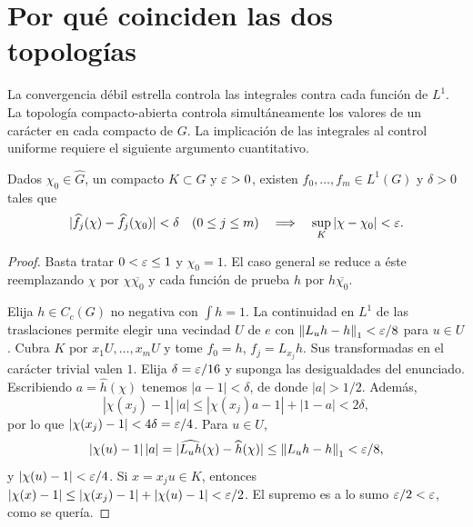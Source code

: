 \section{Por qué coinciden las dos topologías}
La convergencia débil estrella controla las integrales contra cada función de $L^1$. La topología compacto-abierta controla simultáneamente los valores de un carácter en cada compacto de $G$. La implicación de las integrales al control uniforme requiere el siguiente argumento cuantitativo.

\begin{lema}\label{v4:dual-vecindades-integrales}
Dados $\chi_0\in\widehat G$, un compacto $K\subset G$ y $\varepsilon>0$, existen $f_0,\ldots,f_m\in L^1(G)$ y $\delta>0$ tales que
\[
 |\widehat f_j(\chi)-\widehat f_j(\chi_0)|<\delta\quad(0\le j\le m)
 \quad\Longrightarrow\quad
 \sup_K|\chi-\chi_0|<\varepsilon.
\]
\end{lema}
\begin{proof}
Basta tratar $0<\varepsilon\le1$ y $\chi_0=1$. El caso general se reduce a éste reemplazando $\chi$ por $\chi\overline{\chi_0}$ y cada función de prueba $h$ por $h\overline{\chi_0}$.

Elija $h\in C_c(G)$ no negativa con $\int h=1$. La continuidad en $L^1$ de las traslaciones permite elegir una vecindad $U$ de $e$ con
$\left\lVert L_uh-h\right\rVert_1<\varepsilon/8$ para $u\in U$. Cubra $K$ por $x_1U,\ldots,x_mU$ y tome $f_0=h$, $f_j=L_{x_j}h$. Sus transformadas en el carácter trivial valen $1$. Elija $\delta=\varepsilon/16$ y suponga las desigualdades del enunciado. Escribiendo $a=\widehat h(\chi)$ tenemos $|a-1|<\delta$, de donde $|a|>1/2$. Además,
\[
 |\chi(x_j)-1|\,|a|
 \le|\chi(x_j)a-1|+|1-a|<2\delta,
\]
por lo que $|\chi(x_j)-1|<4\delta=\varepsilon/4$. Para $u\in U$,
\[
 |\chi(u)-1|\,|a|
 =|\widehat{L_uh}(\chi)-\widehat h(\chi)|
 \le\left\lVert L_uh-h\right\rVert_1<\varepsilon/8,
\]
y $|\chi(u)-1|<\varepsilon/4$. Si $x=x_ju\in K$, entonces
$|\chi(x)-1|\le|\chi(x_j)-1|+|\chi(u)-1|<\varepsilon/2$. El supremo es a lo sumo $\varepsilon/2<\varepsilon$, como se quería.
\end{proof}

